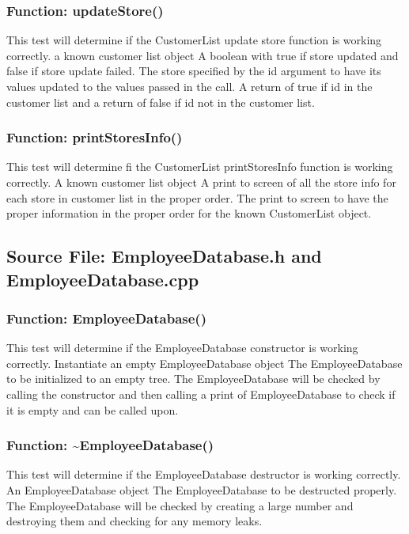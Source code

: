 \documentclass[12pt]{article}%
\newcounter{subsubsubsection}[subsubsection]
\begin{document}
\subsubsection{Function: updateStore()}
This test will determine if the CustomerList update store function is working correctly.
a known customer list object
A boolean with true if store updated and false if store update failed.
The store specified by the id argument to have its values updated to the values passed in the call. A return
of true if id in the customer list and a return of false if id not in the customer list.

\subsubsection{Function: printStoresInfo()}
This test will determine fi the CustomerList printStoresInfo function is working correctly.
A known customer list object
A print to screen of all the store info for each store in customer list in the proper order.
The print to screen to have the proper information in the proper order for the known
CustomerList object.

\subsection{Source File: EmployeeDatabase.h and EmployeeDatabase.cpp}
\subsubsection{Function: EmployeeDatabase()}
This test will determine if the EmployeeDatabase constructor is working correctly.
Instantiate an empty EmployeeDatabase object
The EmployeeDatabase to be initialized to an empty tree.
The EmployeeDatabase will be checked by calling the constructor and then calling a print of EmployeeDatabase
to check if it is empty and can be called upon.

\subsubsection{Function: \textasciitilde EmployeeDatabase()}
This test will determine if the EmployeeDatabase destructor is working correctly.
An EmployeeDatabase object
The EmployeeDatabase to be destructed properly.
The EmployeeDatabase will be checked by creating a large number and destroying them and checking for any memory leaks.
\end{document}
